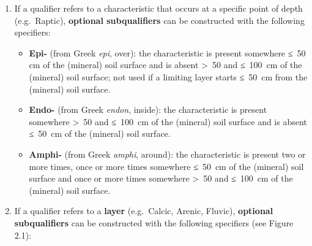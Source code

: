 \documentclass[
  letterpaper,
  DIV=11,
  numbers=noendperiod]{scrreprt}
\providecommand{\tightlist}{%
  \setlength{\itemsep}{0pt}\setlength{\parskip}{0pt}}\usepackage{longtable,booktabs,array}
\begin{document}
\begin{enumerate}
\def\labelenumi{\arabic{enumi}.}
\tightlist
\item
  If a qualifier refers to a characteristic that occurs at a specific
  point of depth (e.g.~Raptic), \textbf{optional subqualifiers} can be
  constructed with the following specifiers:

  \begin{itemize}
  \tightlist
  \item
    \textbf{Epi-} (from Greek \emph{epi}, over): the characteristic is
    present somewhere ≤~50 cm of the (mineral) soil surface and is
    absent \textgreater~50 and ≤~100~cm of the (mineral) soil surface;
    not used if a limiting layer starts ≤~50~cm from the (mineral) soil
    surface.
  \item
    \textbf{Endo-} (from Greek \emph{endon}, inside): the characteristic
    is present somewhere \textgreater~50 and ≤~100~cm of the (mineral)
    soil surface and is absent ≤~50~cm of the (mineral) soil surface.
  \item
    \textbf{Amphi-} (from Greek \emph{amphi}, around): the
    characteristic is present two or more times, once or more times
    somewhere ≤~50~cm of the (mineral) soil surface and once or more
    times somewhere \textgreater~50 and ≤~100~cm of the (mineral) soil
    surface.
  \end{itemize}
\item
  If a qualifier refers to a \textbf{layer} (e.g.~Calcic, Arenic,
  Fluvic), \textbf{optional subqualifiers} can be constructed with the
  following specifiers (see Figure 2.1):


\end{enumerate}
\end{document}
